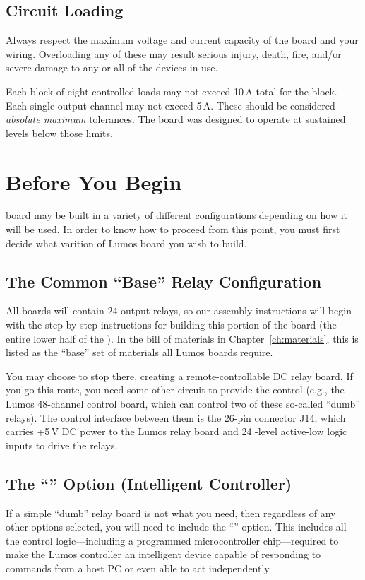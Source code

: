 \documentclass[letterpaper,twoside,onecolumn,openright,final]{memoir}
\begin{document}
\section{Circuit Loading}
Always respect the maximum voltage and current capacity of the board and your wiring.  Overloading any
of these may result serious injury, death, fire, and/or severe damage to any or all of the devices in use.

Each block of eight controlled loads may not exceed 
10\,A total for the block.  
Each single output channel
may not exceed 5\,A.  These should be considered \emph{absolute maximum} tolerances.  The board was designed
to operate at sustained levels below those limits.

\chapter{Before You Begin}\label{ch:before}
 board may be built in a variety of different configurations
depending on how it will be used.  In order to know how to proceed from this point, you must
first decide what varition of Lumos board you wish to build.

\section{The Common ``Base'' Relay Configuration}

All boards
will contain 24 output relays, so our assembly instructions will begin with the step-by-step 
instructions for building this portion of the board (the entire lower half of the ).
In the bill of materials in Chapter~\ref{ch:materials}, this is listed as the ``base'' set of
materials all Lumos boards require.

You may choose to stop there, creating a remote-controllable DC relay board.  If you go this route,
you need some other circuit to provide the control (e.g., the Lumos 48-channel control board,
which can control two of these so-called ``dumb'' relays).  The control interface between them is the
26-pin connector J14, which carries +5\,V DC power to the Lumos relay board and 24 -level
active-low logic inputs to drive the relays.


\section{The ``'' Option (Intelligent Controller)}
If a simple ``dumb'' relay board is not what you need, then regardless of any other options selected, 
you will need to include the ``'' option.  This includes all the control logic---including
a programmed microcontroller chip---required to make the Lumos controller an intelligent device capable
of responding to commands from a host PC or even able to act independently.
\end{document}
